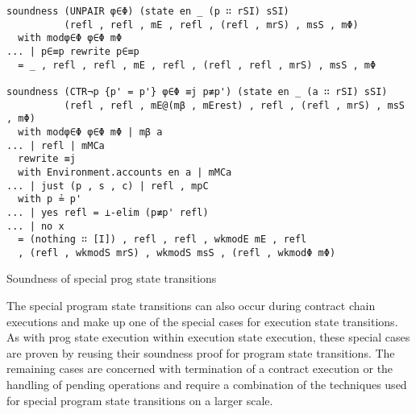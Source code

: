 \begin{listing}[!ht]
\begin{verbatim}
soundness (UNPAIR φ∈Φ) (state en _ (p ∷ rSI) sSI)
          (refl , refl , mE , refl , (refl , mrS) , msS , mΦ)
  with modφ∈Φ φ∈Φ mΦ
... | p∈≡p rewrite p∈≡p
  = _ , refl , refl , mE , refl , (refl , refl , mrS) , msS , mΦ

soundness (CTR¬p {p' = p'} φ∈Φ ≡j p≢p') (state en _ (a ∷ rSI) sSI)
          (refl , refl , mE@(mβ , mErest) , refl , (refl , mrS) , msS , mΦ)
  with modφ∈Φ φ∈Φ mΦ | mβ a
... | refl | mMCa
  rewrite ≡j
  with Environment.accounts en a | mMCa
... | just (p , s , c) | refl , mpC
  with p ≟ p'
... | yes refl = ⊥-elim (p≢p' refl)
... | no x
  = (nothing ∷ [I]) , refl , refl , wkmodE mE , refl
  , (refl , wkmodS mrS) , wkmodS msS , (refl , wkmodΦ mΦ)
\end{verbatim}
\caption{Soundness of special prog state transitions}
\label{prog-step-SC}
\end{listing}

The special program state transitions can also occur during contract chain executions
and make up one of the special cases for execution state transitions.
As with prog state execution within execution state execution,
these special cases are proven by reusing their soundness proof for program state transitions.
The remaining cases are concerned with termination of a contract execution
or the handling of pending operations and require a combination of the techniques used
for special program state transitions on a larger scale.


